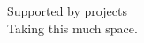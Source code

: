 \documentclass[sigconf]{acmart}
\begin{document}




\begin{acks}
  Supported by projects\\
  Taking this much space.
\end{acks}

%

 
\end{document}

